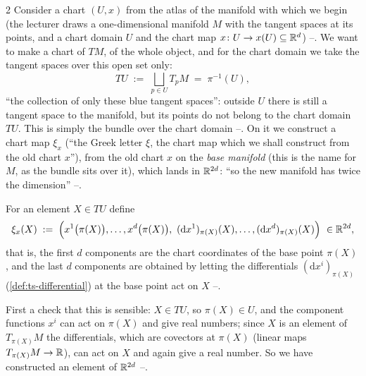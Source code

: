 \begin{paracol}{2}
Consider a chart $(U,x)$ from the atlas of the manifold with which we begin (the lecturer draws a one-dimensional manifold $M$ with the tangent spaces at its points, and a chart domain $U$ and the chart map $x\colon U\to x(U)\subseteq\mathbb{R}^d$) --.
We want to make a chart of $TM$, of the whole object, and for the chart domain we take the tangent spaces over this open set only:
\begin{equation}\label{eq:lag-TU}
  TU\;:=\;\bigsqcup_{p\in U}T_pM\;=\;\pi^{-1}(U),
\end{equation}
``the collection of only these blue tangent spaces'': outside $U$ there is still a tangent space to the manifold, but its points do not belong to the chart domain $TU$. This is simply the bundle over the chart domain --. On it we construct a chart map $\xi_x$ (``the Greek letter $\xi$, the chart map which we shall construct from the old chart $x$''), from the old chart $x$ on the \emph{base manifold} (this is the name for $M$, as the bundle sits over it), which lands in $\mathbb{R}^{2d}$: ``so the new manifold has twice the dimension'' --.

\begin{definition}\label{def:lag-xi}
For an element $X\in TU$ define
\begin{equation}\label{eq:lag-xi}
  \xi_x(X)\;:=\;\Bigl(x^1\bigl(\pi(X)\bigr),\dots,x^d\bigl(\pi(X)\bigr),\ (\mathrm dx^1)_{\pi(X)}(X),\dots,(\mathrm dx^d)_{\pi(X)}(X)\Bigr)\ \in\R^{2d},
\end{equation}
that is, the first $d$ components are the chart coordinates of the base point $\pi(X)$, and the last $d$ components are obtained by letting the differentials $(\mathrm dx^i)_{\pi(X)}$ (\cref{def:ts-differential}) at the base point act on $X$ --.
\end{definition}
First a check that this is sensible: $X\in TU$, so $\pi(X)\in U$, and the component functions $x^i$ can act on $\pi(X)$ and give real numbers; since $X$ is an element of $T_{\pi(X)}M$ the differentials, which are covectors at $\pi(X)$ (linear maps $T_{\pi(X)}M\to\mathbb{R}$), can act on $X$ and again give a real number. So we have constructed an element of $\mathbb{R}^{2d}$ --.


\end{paracol}
